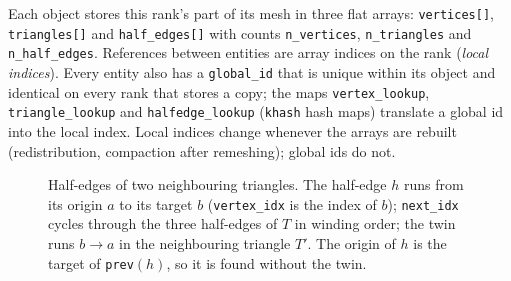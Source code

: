 Each object stores this rank's part of its mesh in three flat arrays: \texttt{vertices[]},
\texttt{triangles[]} and \texttt{half\_edges[]} with counts \texttt{n\_vertices},
\texttt{n\_triangles} and \texttt{n\_half\_edges}. References between entities are array indices
on the rank (\emph{local indices}). Every entity also has a \texttt{global\_id} that is unique
within its object and identical on every rank that stores a copy; the maps
\texttt{vertex\_lookup}, \texttt{triangle\_lookup} and \texttt{halfedge\_lookup} (\texttt{khash}
hash maps) translate a global id into the local index. Local indices change whenever the
arrays are rebuilt (redistribution, compaction after remeshing); global ids do not.

\begin{figure}[ht]
\centering
{}
\caption{Half-edges of two neighbouring triangles. The half-edge $h$ runs from its origin $a$
to its target $b$ (\texttt{vertex\_idx} is the index of $b$); \texttt{next\_idx} cycles through
the three half-edges of $T$ in winding order; the twin runs $b\to a$ in the neighbouring
triangle $T'$. The origin of $h$ is the target of \texttt{prev}$(h)$, so it is found without
the twin.}
\label{fig:halfedge}
\end{figure}

